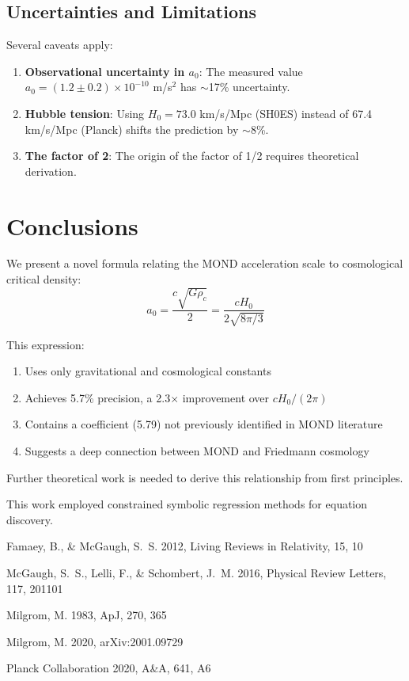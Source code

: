 \documentclass[12pt,preprint]{aastex631}
\begin{document}
\subsection{Uncertainties and Limitations}

Several caveats apply:
\begin{enumerate}
    \item \textbf{Observational uncertainty in $a_0$}: The measured value $a_0 = (1.2 \pm 0.2) \times 10^{-10}$ m/s$^2$ has $\sim$17\% uncertainty.
    \item \textbf{Hubble tension}: Using $H_0 = 73.0$ km/s/Mpc (SH0ES) instead of 67.4 km/s/Mpc (Planck) shifts the prediction by $\sim$8\%.
    \item \textbf{The factor of 2}: The origin of the factor of 1/2 requires theoretical derivation.
\end{enumerate}

\section{Conclusions}
\label{sec:conclusions}

We present a novel formula relating the MOND acceleration scale to cosmological critical density:
\begin{equation}
a_0 = \frac{c \sqrt{G \rho_c}}{2} = \frac{cH_0}{2\sqrt{8\pi/3}}
\end{equation}

This expression:
\begin{enumerate}
    \item Uses only gravitational and cosmological constants
    \item Achieves 5.7\% precision, a 2.3$\times$ improvement over $cH_0/(2\pi)$
    \item Contains a coefficient (5.79) not previously identified in MOND literature
    \item Suggests a deep connection between MOND and Friedmann cosmology
\end{enumerate}

Further theoretical work is needed to derive this relationship from first principles.

\begin{acknowledgments}
This work employed constrained symbolic regression methods for equation discovery.
\end{acknowledgments}

\begin{thebibliography}{}

Famaey, B., \& McGaugh, S.~S. 2012, Living Reviews in Relativity, 15, 10

McGaugh, S.~S., Lelli, F., \& Schombert, J.~M. 2016, Physical Review Letters, 117, 201101

Milgrom, M. 1983, ApJ, 270, 365

Milgrom, M. 2020, arXiv:2001.09729

Planck Collaboration 2020, A\&A, 641, A6

\end{thebibliography}
\end{document}

